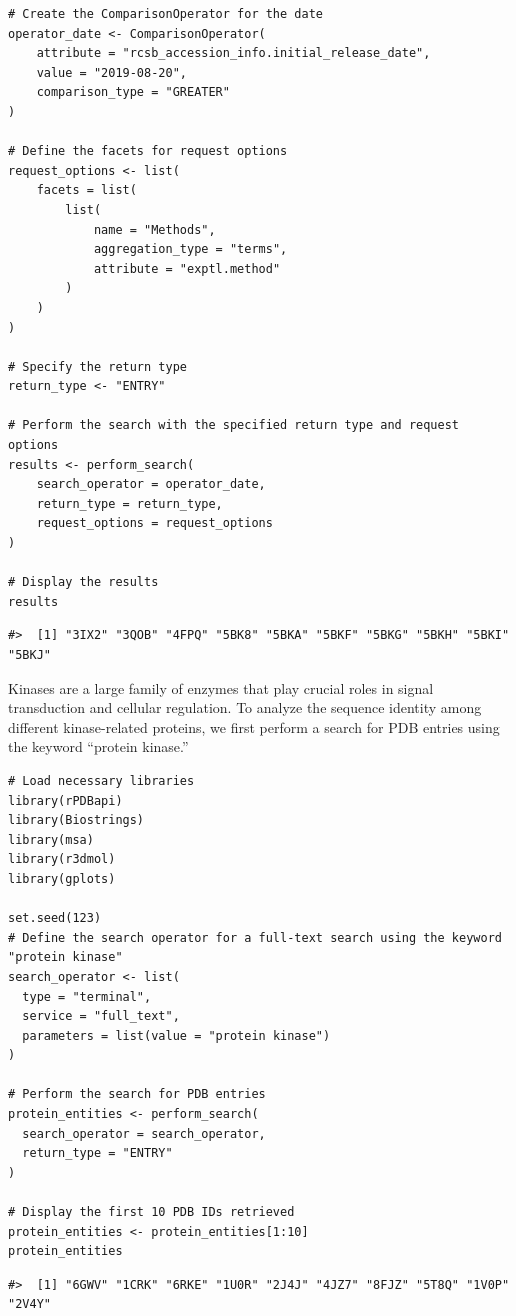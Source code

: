 \begin{verbatim}
# Create the ComparisonOperator for the date
operator_date <- ComparisonOperator(
    attribute = "rcsb_accession_info.initial_release_date",
    value = "2019-08-20",
    comparison_type = "GREATER"
)

# Define the facets for request options
request_options <- list(
    facets = list(
        list(
            name = "Methods",
            aggregation_type = "terms",
            attribute = "exptl.method"
        )
    )
)

# Specify the return type
return_type <- "ENTRY"

# Perform the search with the specified return type and request options
results <- perform_search(
    search_operator = operator_date,
    return_type = return_type,
    request_options = request_options
)

# Display the results
results
\end{verbatim}

\begin{verbatim}
#>  [1] "3IX2" "3QOB" "4FPQ" "5BK8" "5BKA" "5BKF" "5BKG" "5BKH" "5BKI" "5BKJ"
\end{verbatim}

Kinases are a large family of enzymes that play crucial roles in signal transduction and cellular regulation. To analyze the sequence identity among different kinase-related proteins, we first perform a search for PDB entries using the keyword ``protein kinase.''

\begin{verbatim}
# Load necessary libraries
library(rPDBapi)
library(Biostrings)
library(msa)
library(r3dmol)
library(gplots)

set.seed(123)
# Define the search operator for a full-text search using the keyword "protein kinase"
search_operator <- list(
  type = "terminal",
  service = "full_text",
  parameters = list(value = "protein kinase")
)

# Perform the search for PDB entries
protein_entities <- perform_search(
  search_operator = search_operator,
  return_type = "ENTRY"
)

# Display the first 10 PDB IDs retrieved
protein_entities <- protein_entities[1:10]
protein_entities
\end{verbatim}

\begin{verbatim}
#>  [1] "6GWV" "1CRK" "6RKE" "1U0R" "2J4J" "4JZ7" "8FJZ" "5T8Q" "1V0P" "2V4Y"
\end{verbatim}

